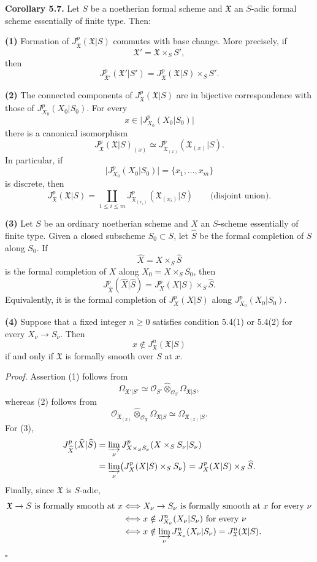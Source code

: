 \medskip
\noindent\textbf{Corollary 5.7.}
Let $S$ be a noetherian formal scheme and $\mathfrak X$ an $S$-adic
formal scheme essentially of finite type. Then:

\smallskip
\noindent\textbf{(1)} Formation of
$J_{\mathfrak X}^p(\mathfrak X|S)$ commutes with base change. More
precisely, if
\[
\mathfrak X'=\mathfrak X\times_SS',
\]
then
\[
J_{\mathfrak X'}^p(\mathfrak X'|S')
=J_{\mathfrak X}^p(\mathfrak X|S)\times_SS'.
\]

\smallskip
\noindent\textbf{(2)} The connected components of
$J_{\mathfrak X}^p(\mathfrak X|S)$ are in bijective correspondence
with those of $J_{X_0}^p(X_0|S_0)$. For every
\[
x\in\bigl|J_{X_0}^p(X_0|S_0)\bigr|
\]
there is a canonical isomorphism
\[
J_{\mathfrak X}^p(\mathfrak X|S)_{(x)}
\simeq
J_{\mathfrak X_{(x)}}^p(\mathfrak X_{(x)}|S).
\]
In particular, if
\[
\bigl|J_{X_0}^p(X_0|S_0)\bigr|=\{x_1,\ldots,x_m\}
\]
is discrete, then
\[
J_{\mathfrak X}^p(\mathfrak X|S)
=\coprod_{1\leq i\leq m}
 J_{\mathfrak X_{(x_i)}}^p(\mathfrak X_{(x_i)}|S)
\qquad\text{(disjoint union)}.
\]


\smallskip
\noindent\textbf{(3)} Let $S$ be an ordinary noetherian scheme and
$X$ an $S$-scheme essentially of finite type. Given a closed
subscheme $S_0\subset S$, let $\widehat S$ be the formal completion
of $S$ along $S_0$. If
\[
\widehat X=X\times_S\widehat S
\]
is the formal completion of $X$ along
$X_0=X\times_SS_0$, then
\[
J_{\widehat X}^p(\widehat X|\widehat S)
=J_X^p(X|S)\times_S\widehat S.
\]
Equivalently, it is the formal completion of $J_X^p(X|S)$ along
$J_{X_0}^p(X_0|S_0)$.

\smallskip
\noindent\textbf{(4)} Suppose that a fixed integer $n\geq0$
satisfies condition 5.4(1) or 5.4(2) for every
$X_\nu\longrightarrow S_\nu$. Then
\[
x\notin J_{\mathfrak X}^n(\mathfrak X|S)
\]
if and only if $\mathfrak X$ is formally smooth over $S$ at $x$.

\smallskip
\noindent\textit{Proof.}
Assertion (1) follows from
\[
\Omega_{\mathfrak X'|S'}
\simeq
\mathcal O_{S'}\widehat\otimes_{\mathcal O_S}
\Omega_{\mathfrak X|S},
\]
whereas (2) follows from
\[
\mathcal O_{\mathfrak X_{(x)}}
\widehat\otimes_{\mathcal O_{\mathfrak X}}
\Omega_{\mathfrak X|S}
\simeq\Omega_{\mathfrak X_{(x)}|S}.
\]
For (3),
\[
\begin{aligned}
J_{\widehat X}^p(\widehat X|\widehat S)
&=\varinjlim_\nu
 J_{X\times_SS_\nu}^p(X\times_SS_\nu|S_\nu) \\
&=\varinjlim_\nu\bigl(J_X^p(X|S)\times_SS_\nu\bigr)
 =J_X^p(X|S)\times_S\widehat S.
\end{aligned}
\]
Finally, since $\mathfrak X$ is $S$-adic,
\[
\begin{aligned}
\mathfrak X\to S\text{ is formally smooth at }x
&\Longleftrightarrow
 X_\nu\to S_\nu\text{ is formally smooth at }x
 \text{ for every }\nu \\
&\Longleftrightarrow
 x\notin J_{X_\nu}^n(X_\nu|S_\nu)
 \text{ for every }\nu \\
&\Longleftrightarrow
 x\notin\varinjlim_\nu J_{X_\nu}^n(X_\nu|S_\nu)
 =J_{\mathfrak X}^n(\mathfrak X|S).
\end{aligned}
\]
\hfill$\square$
